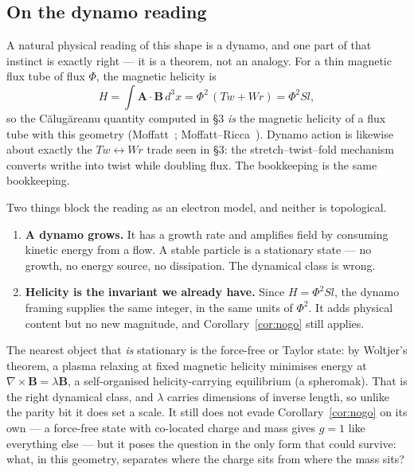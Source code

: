 \documentclass[11pt,a4paper]{article}
\begin{document}
\subsection{On the dynamo reading}
\label{sec:dynamo}

A natural physical reading of this shape is a dynamo, and one part of
that instinct is exactly right --- it is a theorem, not an analogy.  For
a thin magnetic flux tube of flux $\Phi$, the magnetic helicity is
\begin{equation}
H = \int \bm{A}\cdot\bm{B}\,d^3x = \Phi^2\,(Tw + Wr) = \Phi^2 Sl,
\end{equation}
so the C\u{a}lug\u{a}reanu quantity computed in \S3 \emph{is} the magnetic
helicity of a flux tube with this geometry
(Moffatt~\cite{moffatt1969}; Moffatt--Ricca~\cite{moffattricca1992}).
Dynamo action is likewise about exactly the $Tw \leftrightarrow Wr$ trade
seen in \S3: the stretch--twist--fold mechanism converts writhe into
twist while doubling flux.  The bookkeeping is the same bookkeeping.

Two things block the reading as an electron model, and neither is
topological.

\begin{enumerate}[leftmargin=1.4em,itemsep=3pt]
  \item \textbf{A dynamo grows.}  It has a growth rate and amplifies
    field by consuming kinetic energy from a flow.  A stable particle is
    a stationary state --- no growth, no energy source, no dissipation.
    The dynamical class is wrong.
  \item \textbf{Helicity is the invariant we already have.}  Since
    $H = \Phi^2 Sl$, the dynamo framing supplies the same integer, in the
    same units of $\Phi^2$.  It adds physical content but no new
    magnitude, and Corollary~\ref{cor:nogo} still applies.
\end{enumerate}

The nearest object that \emph{is} stationary is the force-free or Taylor
state: by Woltjer's theorem, a plasma relaxing at fixed magnetic helicity
minimises energy at $\nabla\times\bm{B} = \lambda\bm{B}$, a
self-organised helicity-carrying equilibrium (a spheromak).  That is the
right dynamical class, and $\lambda$ carries dimensions of inverse
length, so unlike the parity bit it does set a scale.  It still does not
evade Corollary~\ref{cor:nogo} on its own --- a force-free state with
co-located charge and mass gives $g=1$ like everything else --- but it
poses the question in the only form that could survive: what, in this
geometry, separates where the charge sits from where the mass sits?
\end{document}
